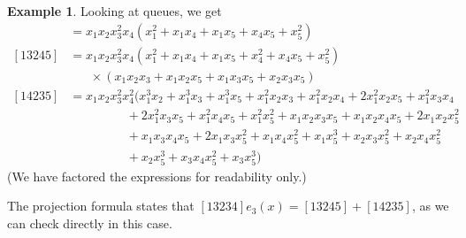 \documentclass[reqno]{amsart}
\newcommand{\0}{\phantom{c}}
\theoremstyle{plain}
\theoremstyle{definition}
\newtheorem{example}[thm]{Example}
\numberwithin{equation}{section}
\begin{document}

\begin{example}
Looking at queues, we get
\begin{align*}
[13234] & = x_1 x_2 x_3^2 x_4 (x_1^2 + x_1 x_4 + x_1 x_5 + x_4 x_5 + x_5^2)
\\ [13245] & = x_1 x_2 x_3^2 x_4 (x_1^2 + x_1x_4 + x_1x_5 + x_4^2 + x_4x_5 + x_5^2)
\\ & \hspace{20pt} \times (x_1x_2x_3 + x_1x_2x_5+x_1x_3x_5+x_2x_3x_5)
\\ [14235] & = x_1x_2x_3^2x_4^2 (x_1^3x_2 + x_1^3x_3 + x_1^3x_5 + x_1^2x_2x_3 + x_1^2x_2x_4 + 2x_1^2x_2x_5 + x_1^2x_3x_4
\\ & \hspace{55pt} + 2x_1^2x_3x_5 + x_1^2x_4x_5 + x_1^2x_5^2 + x_1x_2x_3x_5 + x_1x_2x_4x_5 + 2x_1x_2x_5^2
\\ & \hspace{55pt} + x_1x_3x_4x_5 + 2x_1x_3x_5^2 + x_1x_4x_5^2 + x_1x_5^3 + x_2x_3x_5^2 + x_2x_4x_5^2
\\ & \hspace{55pt} + x_2x_5^3 + x_3x_4x_5^2 + x_3x_5^3)
\end{align*}
(We have factored the expressions for readability only.)

The projection formula states that $[13234] e_3(x) = [13245] + [14235]$, as we can check directly in this case.
\end{example}
\end{document}
